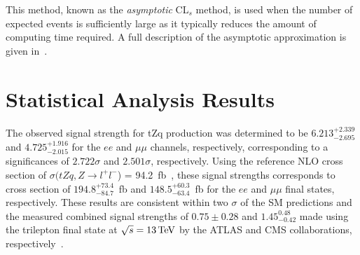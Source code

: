 This method, known as the \emph{asymptotic} CL$_{s}$ method, is used when the number of expected events is sufficiently large as it typically reduces the amount of computing time required.
A full description of the asymptotic approximation is given in~\cite{AsymptoticFormulae}.

%
%
%
%
%

\clearpage
\newpage

\section{Statistical Analysis Results}\label{sec:results}
The observed signal strength for tZq production was determined to be $6.213_{-2.695}^{+2.339}$ and $4.725_{-2.015}^{+1.916}$ for the $ee$ and $\mu\mu$ channels, respectively, corresponding to a significances of $2.722 \sigma$ and $2.501\sigma$, respectively. %
Using the reference NLO cross section of $\sigma (tZq, Z \rightarrow l^{+} l^{-}$) = 94.2~fb~\cite{Campbell:2013yla}, these signal strengths corresponds to cross section of $194.8_{-84.7}^{+73.4}$~fb and $148.5_{-63.4}^{+60.3}$~fb for the $ee$ and $\mu\mu$ final states, respectively. %
These results are consistent within two $\sigma$ of the SM predictions and the measured combined signal strengths of $0.75 \pm 0.28$ and $1.45^{0.48}_{-0.42}$ made using the trilepton final state at $\sqrt{s} = 13 \,\text{Te\hspace{-.08em}V}$ by the ATLAS and CMS collaborations, respectively~\cite{Aaboud:2017ylb,Sirunyan:2017nbr}.

